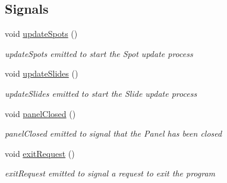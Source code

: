 \subsection*{Signals}
\begin{DoxyCompactItemize}
\item 
\mbox{\label{classScorePanel_aa339aecc1d8808e0cbbf78e4d3cfd195}} 
void \mbox{\hyperlink{classScorePanel_aa339aecc1d8808e0cbbf78e4d3cfd195}{update\+Spots}} ()
\begin{DoxyCompactList}\small\item\em update\+Spots emitted to start the Spot update process \end{DoxyCompactList}\item 
\mbox{\label{classScorePanel_a8b9256b99863d98cd2f7546aafa4c39f}} 
void \mbox{\hyperlink{classScorePanel_a8b9256b99863d98cd2f7546aafa4c39f}{update\+Slides}} ()
\begin{DoxyCompactList}\small\item\em update\+Slides emitted to start the Slide update process \end{DoxyCompactList}\item 
\mbox{\label{classScorePanel_a665992ebbd2a46625fd713593d2393a6}} 
void \mbox{\hyperlink{classScorePanel_a665992ebbd2a46625fd713593d2393a6}{panel\+Closed}} ()
\begin{DoxyCompactList}\small\item\em panel\+Closed emitted to signal that the Panel has been closed \end{DoxyCompactList}\item 
\mbox{\label{classScorePanel_a1c0b06c69f565e8f3ecb013d42bb130e}} 
void \mbox{\hyperlink{classScorePanel_a1c0b06c69f565e8f3ecb013d42bb130e}{exit\+Request}} ()
\begin{DoxyCompactList}\small\item\em exit\+Request emitted to signal a request to exit the program \end{DoxyCompactList}\end{DoxyCompactItemize}
